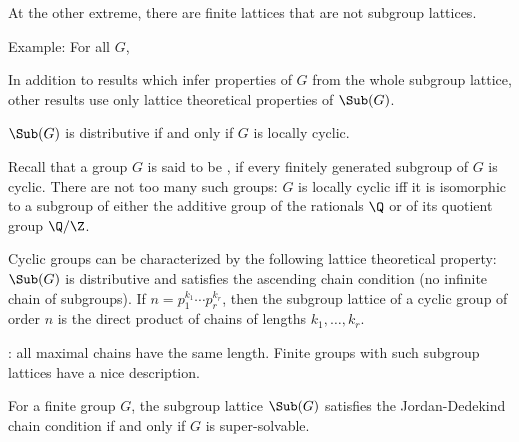 \begin{frame}[fragile,label=Motivation]{}
At the other extreme, there are finite lattices that are not subgroup lattices.

\vskip6mm

\alert{Example:} For all $G$,
\vskip1mm  \hskip25mm
\end{frame}

\begin{frame}[fragile,label=Ore]{}
In addition to results which infer properties of $G$ from the
whole subgroup lattice, other results use only lattice
theoretical properties of $\Sub(G)$.
\vskip4mm
\begin{theorem}[Ore, 1937] 
$\Sub(G)$ is distributive if and only if $G$ is locally cyclic.
\end{theorem}
\end{frame}
\begin{frame}[fragile,label=Ore]{}
Recall that a group $G$ is said to be , if every finitely
generated subgroup of $G$ is cyclic. 
\vskip4mm
There are not too many such groups: $G$ is locally
cyclic iff it is isomorphic to a subgroup of either the additive group of
the rationals $\Q$ or of its quotient group $\Q/\Z$.
\end{frame}
\begin{frame}[fragile,label=Ore]{}
Cyclic groups can be characterized by the following lattice theoretical
property: $\Sub(G)$ is distributive
and satisfies the ascending chain condition (no infinite chain of subgroups).
\vskip4mm
If $n = p_1^{k_1}\cdots p_r^{k_r}$, then the subgroup lattice of
a cyclic group of order $n$ is the direct product of chains of lengths $k_1,
\dots, k_r$.
\end{frame}
\begin{frame}[fragile,label=Iwasawa]{}
: all maximal chains
have the same length. Finite groups with such subgroup lattices have a
nice description.
\vskip4mm
\begin{theorem}[Iwasawa, 1941]
For a finite group $G$, the subgroup lattice
$\Sub(G)$ satisfies the Jordan-Dedekind chain condition if and only if $G$ is
super-solvable.
\end{theorem}
\end{frame}

